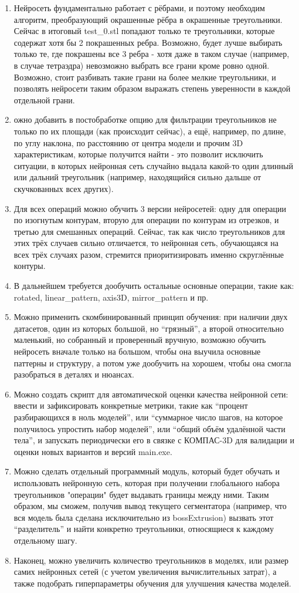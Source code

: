 \begin{enumerate}
    \item Нейросеть фундаментально работает с рёбрами, и поэтому необходим алгоритм, преобразующий окрашенные рёбра в окрашенные треугольники. Сейчас в итоговый test\_0.stl попадают только те треугольники, которые содержат хотя бы 2 покрашенных ребра. Возможно, будет лучше выбирать только те, где покрашены все 3 ребра - хотя даже в таком случае (например, в случае тетраэдра) невозможно выбрать все грани кроме ровно одной. Возможно, стоит разбивать такие грани на более мелкие треугольники, и позволять нейросети таким образом выражать степень уверенности в каждой отдельной грани.
    \item ожно добавить в постобработке опцию для фильтрации треугольников не только по их площади (как происходит сейчас), а ещё, например, по длине, по углу наклона, по расстоянию от центра модели и прочим 3D характеристикам, которые получится найти - это позволит исключить ситуации, в которых нейронная сеть случайно выдала какой-то один длинный или дальний треугольник (например, находящийся сильно дальше от скучкованных всех других).
    \item Для всех операций можно обучить 3 версии нейросетей: одну для операции по изогнутым контурам, вторую для операции по контурам из отрезков, и третью для смешанных операций. Сейчас, так как число треугольников для этих трёх случаев сильно отличается, то нейронная сеть, обучающаяся на всех трёх случаях разом, стремится приоритизировать именно скруглённые контуры.
    \item В дальнейшем требуется дообучить остальные основные операции, такие как: rotated, linear\_pattern, axis3D, mirror\_pattern и пр.
    \item Можно применить скомбинированный принцип обучения: при наличии двух датасетов, один из которых большой, но “грязный”, а второй относительно маленький, но собранный и проверенный вручную, возможно обучить нейросеть вначале только на большом, чтобы она выучила основные паттерны и структуру, а потом уже дообучить на хорошем, чтобы она смогла разобраться в деталях и нюансах.
    \item Можно создать скрипт для автоматической оценки качества нейронной сети: ввести и зафиксировать конкретные метрики, такие как “процент разбирающихся в ноль моделей”, или “суммарное число шагов, на которое получилось упростить набор моделей”, или “общий объём удалённой части тела”, и запускать периодически его в связке с КОМПАС-3D для валидации и оценки новых вариантов и версий main.exe.
    \item Можно сделать отдельный программный модуль, который будет обучать и использовать нейронную сеть, которая при получении глобального набора треугольников "операции" будет выдавать границы между ними. Таким образом, мы сможем, получив вывод текущего сегментатора (например, что вся модель была сделана исключительно из bossExtrusion) вызвать этот “разделитель” и найти конкретно треугольники, относящиеся к каждому отдельному шагу.
    \item Наконец, можно увеличить количество треугольников в моделях, или размер самих нейронных сетей (с учетом увеличения вычислительных затрат), а также подобрать гиперпараметры обучения для улучшения качества моделей.
\end{enumerate}

